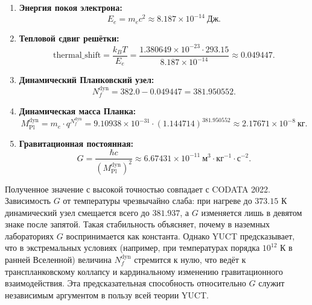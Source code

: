 \documentclass[11pt,a4paper]{article}
\begin{document}
	\begin{enumerate}
		\item \textbf{Энергия покоя электрона:}
		\begin{equation}
			E_e = m_e c^2 \approx 8.187 \times 10^{-14}~\text{Дж}.
		\end{equation}
		\item \textbf{Тепловой сдвиг решётки:}
		\begin{equation}
			\text{thermal\_shift} = \frac{k_B T}{E_e} = \frac{1.380649 \times 10^{-23} \cdot 293.15}{8.187 \times 10^{-14}} \approx 0.049447.
		\end{equation}
		\item \textbf{Динамический Планковский узел:}
		\begin{equation}
			N_f^{\text{dyn}} = 382.0 - 0.049447 = 381.950552.
		\end{equation}
		\item \textbf{Динамическая масса Планка:}
		\begin{equation}
			M_{\text{Pl}}^{\text{dyn}} = m_e \cdot q^{N_f^{\text{dyn}}} = 9.10938 \times 10^{-31} \cdot (1.144714)^{381.950552} \approx 2.17671 \times 10^{-8}~\text{кг}.
		\end{equation}
		\item \textbf{Гравитационная постоянная:}
		\begin{equation}
			G = \frac{\hbar c}{(M_{\text{Pl}}^{\text{dyn}})^2} \approx 6.67431 \times 10^{-11}~\text{м}^3\!\cdot\!\text{кг}^{-1}\!\cdot\!\text{с}^{-2}.
		\end{equation}
	\end{enumerate}
	
	Полученное значение с высокой точностью совпадает с CODATA 2022. Зависимость $G$ от температуры чрезвычайно слаба: при нагреве до $373.15$ К динамический узел смещается всего до $381.937$, а $G$ изменяется лишь в девятом знаке после запятой. Такая стабильность объясняет, почему в наземных лабораториях $G$ воспринимается как константа. Однако YUCT предсказывает, что в экстремальных условиях (например, при температурах порядка $10^{12}$ К в ранней Вселенной) величина $N_f^{\text{dyn}}$ стремится к нулю, что ведёт к транспланковскому коллапсу и кардинальному изменению гравитационного взаимодействия. Эта предсказательная способность относительно $G$ служит независимым аргументом в пользу всей теории YUCT.
	
\end{document}
